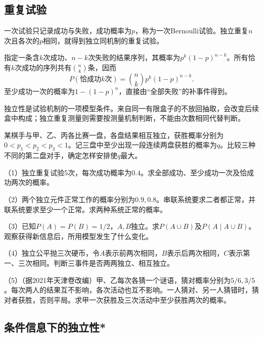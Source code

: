 \subsection{重复试验}

一次试验只记录成功与失败，成功概率为\(p\)，称为一次{\heiti Bernoulli试验}。独立重复\(n\)次且各次的\(p\)相同，就得到独立同机制的重复试验。

指定一条含\(k\)次成功、\(n-k\)次失败的结果序列，其概率为\(p^k(1-p)^{n-k}\)。所有恰有\(k\)次成功的序列共有\(\binom nk\)条，因而
\begin{equation}\label{eq:prob-bernoulli-count}
 P(\text{恰成功}k\text{次})=\binom nkp^k(1-p)^{n-k}.
\end{equation}
至少成功一次的概率为\(1-(1-p)^n\)，直接由“全部失败”的补事件得到。

独立性是试验机制的一项模型条件。来自同一有限盒子的不放回抽取，会改变后续盒中构成；独立重复测量则需要按测量机制判断，不能由次数相同代替判断。

\begin{example}[据2022年全国乙卷理科改编]
某棋手与甲、乙、丙各比赛一盘，各盘结果相互独立，获胜概率分别为\(0<p_1<p_2<p_3<1\)。记三盘中至少出现一段连续两盘获胜的概率为\(q\)。比较三种不同的第二盘对手，确定怎样安排使\(q\)最大。
\end{example}

\begin{exercise}
\mbox{}\par\nobreak

（1）独立重复试验5次，每次成功概率为\(0.4\)。求全部成功、至少成功一次及恰成功两次的概率。

（2）两个独立元件正常工作的概率分别为\(0.9,0.8\)。串联系统要求二者都正常，并联系统要求至少一个正常。求两种系统正常的概率。

（3）已知\(P(A)=P(B)=1/2\)，\(A,B\)独立。求\(P(A\cup B)\)及\(P(A\mid A\cup B)\)。观察获得新信息后，所用模型发生了什么变化。

（4）独立公平抛三次硬币，令\(A\)表示前两次相同，\(B\)表示后两次相同，\(C\)表示第一、三次相同。判断三事件是否两两独立、相互独立。

（5）（据2021年天津卷改编）甲、乙每次各猜一个谜语，猜对概率分别为\(5/6,3/5\)。每次两人的结果互不影响，各次活动也互不影响。一人猜对、另一人猜错时，猜对者获胜，否则平局。求甲一次获胜及三次活动中至少获胜两次的概率。
\end{exercise}

\FloatBarrier
\newpage
\subsection{条件信息下的独立性*}

